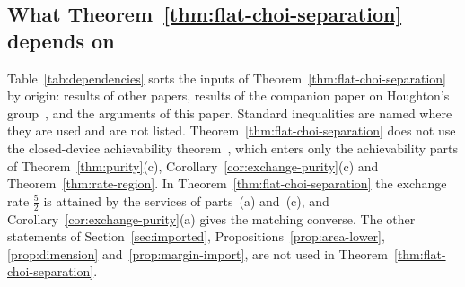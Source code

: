 \documentclass[11pt,a4paper]{article}
\theoremstyle{plain}
\theoremstyle{definition}
\theoremstyle{remark}
\begin{document}
\subsection{What \texorpdfstring{Theorem~\ref{thm:flat-choi-separation}}{Theorem A} depends on}\label{sec:dependencies}

Table~\ref{tab:dependencies} sorts the inputs of Theorem~\ref{thm:flat-choi-separation} by origin: results of other papers, results of the
companion paper on Houghton's group~\cite{DouglasMghirbiA}, and the arguments of this paper. Standard inequalities are named where they are
used and are not listed. Theorem~\ref{thm:flat-choi-separation} does not use the closed-device achievability
theorem~\cite[Theorem~2.1]{Douglas2026closed}, which enters only the achievability parts of Theorem~\ref{thm:purity}(c), Corollary~\ref{cor:exchange-purity}(c) and Theorem~\ref{thm:rate-region}. In
Theorem~\ref{thm:flat-choi-separation} the exchange rate $\frac52$ is attained by the services of parts~(a) and~(c), and
Corollary~\ref{cor:exchange-purity}(a) gives the matching converse. The other statements of Section~\ref{sec:imported},
Propositions~\ref{prop:area-lower}, \ref{prop:dimension} and~\ref{prop:margin-import}, are not used in Theorem~\ref{thm:flat-choi-separation}.
\end{document}
